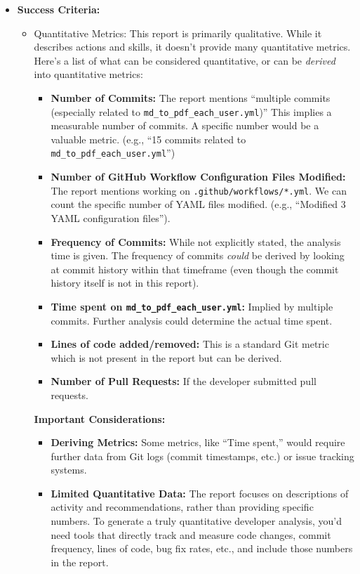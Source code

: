 \documentclass{article}
\begin{document}
\begin{itemize}
    \item \textbf{Success Criteria:}
    \begin{itemize}
        \item Quantitative Metrics: This report is primarily qualitative. While it describes actions and skills, it doesn't provide many quantitative metrics. Here's a list of what can be considered quantitative, or can be \textit{derived} into quantitative metrics:

\begin{itemize}
    \item \textbf{Number of Commits:} The report mentions ``multiple commits (especially related to \texttt{md\_to\_pdf\_each\_user.yml})'' This implies a measurable number of commits. A specific number would be a valuable metric.  (e.g., ``15 commits related to \texttt{md\_to\_pdf\_each\_user.yml}'')
    \item \textbf{Number of GitHub Workflow Configuration Files Modified:} The report mentions working on \texttt{.github/workflows/*.yml}. We can count the specific number of YAML files modified. (e.g., ``Modified 3 YAML configuration files'').
    \item \textbf{Frequency of Commits:} While not explicitly stated, the analysis time is given. The frequency of commits \textit{could} be derived by looking at commit history within that timeframe (even though the commit history itself is not in this report).
    \item \textbf{Time spent on \texttt{md\_to\_pdf\_each\_user.yml}:} Implied by multiple commits. Further analysis could determine the actual time spent.
    \item \textbf{Lines of code added/removed:} This is a standard Git metric which is not present in the report but can be derived.
    \item \textbf{Number of Pull Requests:} If the developer submitted pull requests.
\end{itemize}

\textbf{Important Considerations:}

\begin{itemize}
    \item \textbf{Deriving Metrics:} Some metrics, like ``Time spent,'' would require further data from Git logs (commit timestamps, etc.) or issue tracking systems.
    \item \textbf{Limited Quantitative Data:} The report focuses on descriptions of activity and recommendations, rather than providing specific numbers. To generate a truly quantitative developer analysis, you'd need tools that directly track and measure code changes, commit frequency, lines of code, bug fix rates, etc., and include those numbers in the report.
\end{itemize}


\end{itemize}
\end{itemize}
\end{document}
